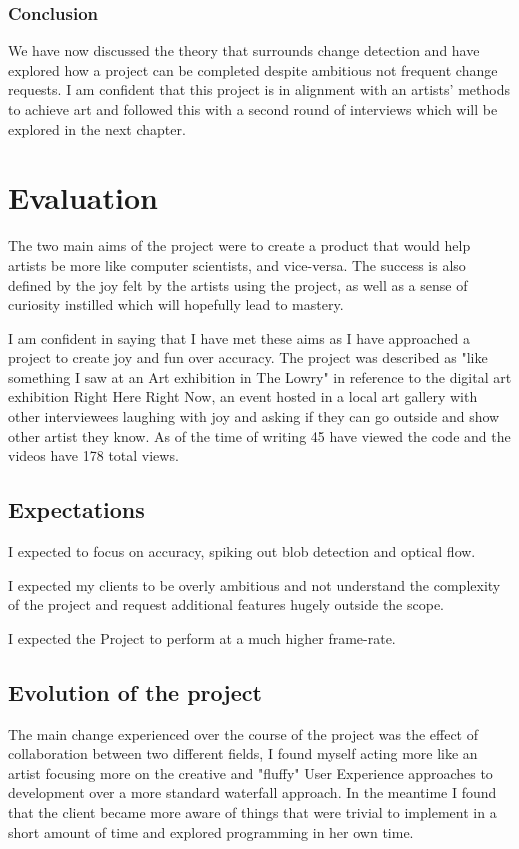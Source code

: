 \documentclass[a4paper]{report}
\begin{document}
\subsection{Conclusion}
We have now discussed the theory that surrounds change detection and have explored how a project can be completed despite ambitious not frequent change requests. I am confident that this project is in alignment with an artists' methods to achieve art and followed this with a second round of interviews which will be explored in the next chapter.

\chapter{Evaluation}
The two main aims of the project were to create a product that would help artists be more like computer scientists, and vice-versa. The success is also defined by the joy felt by the artists using the project, as well as a sense of curiosity instilled which will hopefully lead to mastery.

I am confident in saying that I have met these aims as I have approached a project to create joy and fun over accuracy. The project was described as "like something I saw at an Art exhibition in The Lowry" in reference to the digital art exhibition Right Here Right Now, an event hosted in a local art gallery with other interviewees laughing with joy and asking if they can go outside and show other artist they know. As of the time of writing 45 have viewed the code and the videos have 178 total views.

\section{Expectations}
I expected to focus on accuracy, spiking out blob detection and optical flow.

I expected my clients to be overly ambitious and not understand the complexity of the project and request additional features hugely outside the scope.

I expected the Project to perform at a much higher frame-rate.

\section{Evolution of the project}
The main change experienced over the course of the project was the effect of collaboration between two different fields, I found myself acting more like an artist focusing more on the creative and "fluffy" User Experience approaches to development over a more standard waterfall approach. In the meantime I found that the client became more aware of things that were trivial to implement in a short amount of time and explored programming in her own time.
\end{document}
